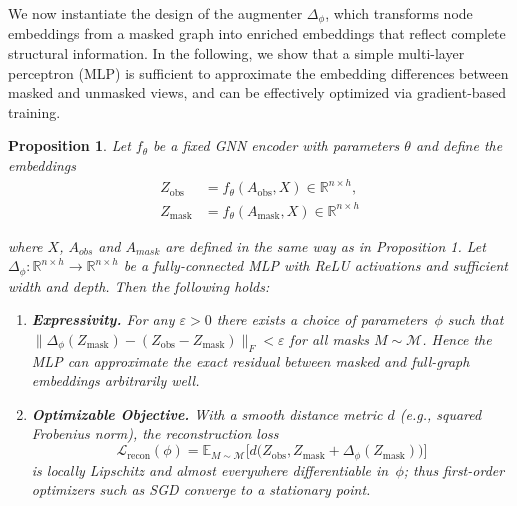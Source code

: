 \documentclass[letterpaper]{article} \usepackage{aaai2026}  \usepackage{times}  \usepackage{helvet}  \usepackage{courier}  \usepackage[hyphens]{url}  \usepackage{graphicx} \urlstyle{rm} \def\UrlFont{\rm}  \usepackage{natbib}  \usepackage{caption} \frenchspacing  \setlength{\pdfpagewidth}{8.5in}  \setlength{\pdfpageheight}{11in}
\newtheorem{proposition}{Proposition}
\begin{document}
We now instantiate the design of the augmenter \( \Delta_{\phi} \), which transforms node embeddings from a masked graph into enriched embeddings that reflect complete structural information. In the following, we show that a simple multi-layer perceptron (MLP) is sufficient to approximate the embedding differences between masked and unmasked views, and can be effectively optimized via gradient-based training.

\begin{proposition}
Let $f_\theta$ be a fixed GNN encoder with parameters $\theta$ and define the embeddings
\begin{equation}
\begin{aligned}
Z_{\mathrm{obs}} &= f_\theta(A_{\mathrm{obs}}, X) \in \mathbb{R}^{n \times h}, \\
Z_{\mathrm{mask}} &= f_\theta(A_{\mathrm{mask}}, X) \in \mathbb{R}^{n \times h}
\end{aligned}
\label{eq:shared_encoding}
\end{equation}

where $X$, $A_{obs}$ and $A_{mask}$ are defined in the same way as in Proposition 1.
Let $\Delta_\phi:\mathbb{R}^{n\times h}\!\to\!\mathbb{R}^{n\times h}$ be a fully-connected MLP with ReLU activations and sufficient width and depth. Then the following holds:

\begin{enumerate}
\item \textbf{Expressivity.}
      For any $\varepsilon>0$ there exists a choice of parameters~$\phi$ such that
      \(
      \bigl\|\Delta_\phi(Z_{\mathrm{mask}})\!-\!(Z_{\mathrm{obs}}\!-\!Z_{\mathrm{mask}})\bigr\|_F<\varepsilon
      \)
      for all masks $M\!\sim\!\mathcal{M}$.  Hence the MLP can approximate the exact residual between masked and full-graph embeddings arbitrarily well.

\item \textbf{Optimizable Objective.}
      With a smooth distance metric $d$ (e.g., squared Frobenius norm), the reconstruction loss
      \[
      \mathcal{L}_{\mathrm{recon}}(\phi)=
      \mathbb{E}_{M\sim\mathcal{M}}
      \bigl[d\bigl(Z_{\mathrm{obs}},
                  Z_{\mathrm{mask}}+\Delta_\phi(Z_{\mathrm{mask}})\bigr)\bigr]
      \]
      is locally Lipschitz and almost everywhere differentiable in~$\phi$; thus first-order optimizers such as SGD converge to a stationary point.
\end{enumerate}
\end{proposition}
\end{document}

